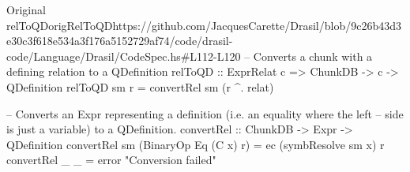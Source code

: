 \begin{haskell}{Original relToQD}{origRelToQD}{https://github.com/JacquesCarette/Drasil/blob/9c26b43d3e30c3f618e534a3f176a5152729af74/code/drasil-code/Language/Drasil/CodeSpec.hs\#L112-L120}
-- Converts a chunk with a defining relation to a QDefinition
relToQD :: ExprRelat c => ChunkDB -> c -> QDefinition
relToQD sm r = convertRel sm (r ^. relat)

-- Converts an Expr representing a definition (i.e. an equality where the left 
-- side is just a variable) to a QDefinition.
convertRel :: ChunkDB -> Expr -> QDefinition
convertRel sm (BinaryOp Eq (C x) r) = ec (symbResolve sm x) r
convertRel _ _ = error "Conversion failed"
\end{haskell}
